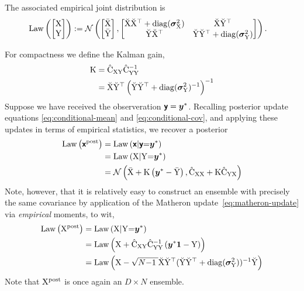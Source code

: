 \documentclass{article}
\begin{document}
{{The associated empirical joint distribution is
\begin{align}
    \operatorname{Law}\left(\begin{bmatrix}
        \mathrm{X}\\
        \mathrm{Y}
    \end{bmatrix}\right) &:= \mathcal{N}\left(\begin{bmatrix}
        \bar{\mathrm{X}}\\
        \bar{\mathrm{Y}}
    \end{bmatrix},
    \begin{bmatrix}
        \breve{\mathrm{X}} \breve{\mathrm{X}}^\top + \operatorname{diag}(\boldsymbol{\sigma}_{\mathrm{X}}^2) & \breve{\mathrm{X}} \breve{\mathrm{Y}}^\top \\
        \breve{\mathrm{Y}} \breve{\mathrm{X}}^\top  & \breve{\mathrm{Y}} \breve{\mathrm{Y}}^\top + \operatorname{diag}(\boldsymbol{\sigma}_{\mathrm{Y}}^2)
    \end{bmatrix}
    \right).
\end{align}

For compactness we define the  Kalman gain,
\begin{align}
    \mathrm{K}
    &= \hat{\mathrm{C}}_{\mathrm{XY}} \hat{\mathrm{C}}_{\mathrm{YY}}^{-1}\\
    &=\breve{\mathrm{X}}\breve{\mathrm{Y}}^\top  \left(
        \breve{\mathrm{Y}}\breve{\mathrm{Y}}^\top+\operatorname{diag}(\boldsymbol{\sigma}^2_{\mathrm{Y}})^{-1}
    \right)^{-1}
    \label{eq:kalman_gain}
\end{align}
Suppose we have received the observeration $\boldsymbol{\mathsf{y}}=\boldsymbol{y}^*$.
Recalling posterior update equations \eqref{eq:conditional-mean} and \eqref{eq:conditional-cov}, and applying these updates in terms of empirical statistics, we recover a posterior
\begin{align}
    \operatorname{Law}\left(\boldsymbol{\mathsf{x}}^{\text{post}}\right)
    &=\operatorname{Law}\left(\boldsymbol{\mathsf{x}}|\boldsymbol{\mathsf{y}}{=}\boldsymbol{y}^*\right)\\
    &=\operatorname{Law}\left(\mathrm{X}|\mathrm{Y}{=}\boldsymbol{y}^*\right)\\
    &= \mathcal{N}\left(
        \bar{\mathrm{X}} +
        \mathrm{K}\left( \boldsymbol{y}^* - \bar{\mathrm{Y}}\right),
        \hat{\mathrm{C}}_{\mathrm{XX}} + \mathrm{K}\hat{\mathrm{C}}_{\mathrm{YX}}
        \right)
\end{align}
Note, however, that it is relatively easy to construct an ensemble with precisely the same covariance by application of the Matheron update~\eqref{eq:matheron-update} via \emph{empirical} moments, to wit,
\begin{align}
    \operatorname{Law}\left(\mathrm{X}^{\text{post}}\right)
    &=\operatorname{Law}\left(\mathrm{X}|\mathrm{Y}{=}\boldsymbol{y}^*\right)\\
    &=\operatorname{Law}\left(\mathrm{X} + \hat{\mathrm{C}}_{\mathrm{XY}} \hat{\mathrm{C}}_{\mathrm{YY}}^{-1} \left( \boldsymbol{y}^*\boldsymbol{1} - \mathrm{Y} \right)\right)\\
    &=\operatorname{Law}\left(\mathrm{X} -\sqrt{N{-}1\;} \breve{\mathrm{X}}\breve{\mathrm{Y}}^\top (\breve{\mathrm{Y}}\breve{\mathrm{Y}}^\top+\operatorname{diag}(\boldsymbol{\sigma}^2_{\mathrm{Y}}))^{-1} \breve{\mathrm{Y}}\right)
\end{align}
Note that $\mathrm{X}^{\text{post}}$ is once again an $D \times N$ ensemble.

}}
\end{document}
